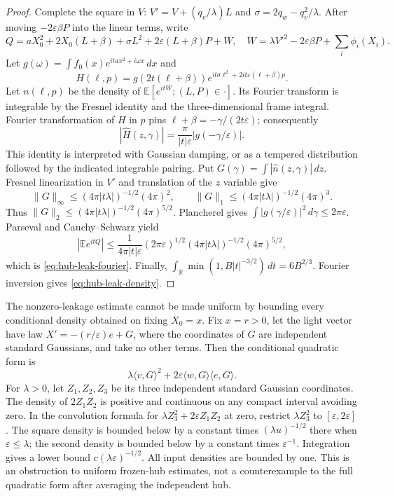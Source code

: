 \begin{proof}
Complete the square in $V$:
$V'=V+(q_v/\lambda)L$ and
$\sigma=2q_w-q_v^2/\lambda$.
After moving $-2\varepsilon\beta P$ into the linear terms, write
\[
 Q=aX_0^2+2X_0(L+\beta)+\sigma L^2+
   2\varepsilon(L+\beta)P+W,
 \quad
 W=\lambda V'^2-2\varepsilon\beta P+\sum_i\phi_i(X_i).
\]
Let $g(\omega)=\int f_0(x)e^{ita x^2+i\omega x}\,dx$ and
\[
 H(\ell,p)=g(2t(\ell+\beta))
                   e^{it\sigma\ell^2+2it\varepsilon(\ell+\beta)p}.
\]
Let $n(\ell,p)$ be the density of
$\mathbb E[e^{itW};(L,P)\in\cdot]$.  Its Fourier transform is
integrable by the Fresnel identity and the three-dimensional frame
integral.  Fourier transformation of $H$ in $p$ pins
$\ell+\beta=-\gamma/(2t\varepsilon)$; consequently
\[
 |\widehat H(z,\gamma)|=
      \frac{\pi}{|t|\varepsilon}|g(-\gamma/\varepsilon)|.
\]
This identity is interpreted with Gaussian damping, or as a tempered
distribution followed by the indicated integrable pairing.
Put $G(\gamma)=\int|\widehat n(z,\gamma)|\,dz$.
Fresnel linearization in $V'$ and translation of the $z$ variable give
\[
 \|G\|_\infty\le(4\pi|t\lambda|)^{-1/2}(4\pi)^2,
 \qquad
 \|G\|_1\le(4\pi|t\lambda|)^{-1/2}(4\pi)^3.
\]
Thus $\|G\|_2\le(4\pi|t\lambda|)^{-1/2}(4\pi)^{5/2}$.
Plancherel gives
$\int|g(\gamma/\varepsilon)|^2\,d\gamma\le2\pi\varepsilon$.
Parseval and Cauchy--Schwarz yield
\[
 |\mathbb E e^{itQ}|
 \le\frac{1}{4\pi|t|\varepsilon}
       (2\pi\varepsilon)^{1/2}
       (4\pi|t\lambda|)^{-1/2}(4\pi)^{5/2},
\]
which is \eqref{eq:hub-leak-fourier}.
Finally, $\int_{\mathbb R}\min(1,B|t|^{-3/2})\,dt=6B^{2/3}$.
Fourier inversion gives \eqref{eq:hub-leak-density}.
\end{proof}

\begin{example}\label{ex:hub-frozen-obstruction}
The nonzero-leakage estimate cannot be made uniform by bounding every
conditional density obtained on fixing $X_0=x$.  Fix $x=r>0$, let the
light vector have law $X'=-(r/\varepsilon)e+G$, where the coordinates
of $G$ are independent standard Gaussians, and take no other terms.
Then the conditional quadratic form is
\[
 \lambda\langle v,G\rangle^2+
       2\varepsilon\langle w,G\rangle\langle e,G\rangle.
\]
For $\lambda>0$, let $Z_1,Z_2,Z_3$ be its three independent standard
Gaussian coordinates.  The density of $2Z_1Z_2$ is positive and
continuous on any compact interval avoiding zero.  In the convolution
formula for $\lambda Z_3^2+2\varepsilon Z_1Z_2$ at zero, restrict
$\lambda Z_3^2$ to $[\varepsilon,2\varepsilon]$.
The square density is bounded below by a constant times
$(\lambda u)^{-1/2}$ there when $\varepsilon\le\lambda$; the second
density is bounded below by a constant times $\varepsilon^{-1}$.
Integration gives a lower bound
$c(\lambda\varepsilon)^{-1/2}$.
All input densities are bounded by one.  This is an obstruction to
uniform frozen-hub estimates, not a counterexample to the full quadratic
form after averaging the independent hub.
\end{example}

